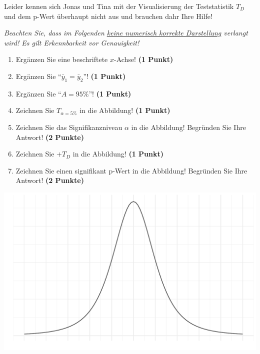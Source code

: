 \documentclass[a4paper, 9pt]{scrartcl}\usepackage[]{graphicx}\usepackage[]{xcolor}
\makeatletter
\def\maxwidth{ %
  \ifdim\Gin@nat@width>\linewidth
    \linewidth
  \else
    \Gin@nat@width
  \fi
}
\makeatother
\begin{document}
\vspace{1ex}

Leider kennen sich Jonas und Tina mit der Visualisierung der Teststatistik $T_D$ und dem p-Wert überhaupt nicht aus und brauchen dahr Ihre Hilfe!

\vspace{1ex}

\textit{Beachten Sie, dass im Folgenden \underline{keine numerisch korrekte Darstellung} verlangt wird! Es gilt Erkennbarkeit vor Genauigkeit!}

\begin{enumerate}
\item Ergänzen Sie eine beschriftete $x$-Achse! \textbf{(1 Punkt)}
\item Ergänzen Sie "`$\bar{y}_1 = \bar{y}_2$"'! \textbf{(1 Punkt)} 
\item Ergänzen Sie "`$A = 95\%$"'! \textbf{(1 Punkt)}
\item Zeichnen Sie $T_{\alpha=5\%}$ in die Abbildung! \textbf{(1 Punkt)} 
\item Zeichnen Sie das Signifikanzniveau $\alpha$ in die Abbildung! Begründen Sie Ihre Antwort! \textbf{(2 Punkte)} 
\item Zeichnen Sie $+T_{D}$ in die Abbildung! \textbf{(1 Punkt)}
\item Zeichnen Sie einen signifikant p-Wert in die Abbildung! Begründen Sie Ihre Antwort! \textbf{(2 Punkte)}   
\end{enumerate}



{\centering \includegraphics[width=\maxwidth]{img/statistisches-testen-3-1} 

}


 
\clearpage
\end{document}

